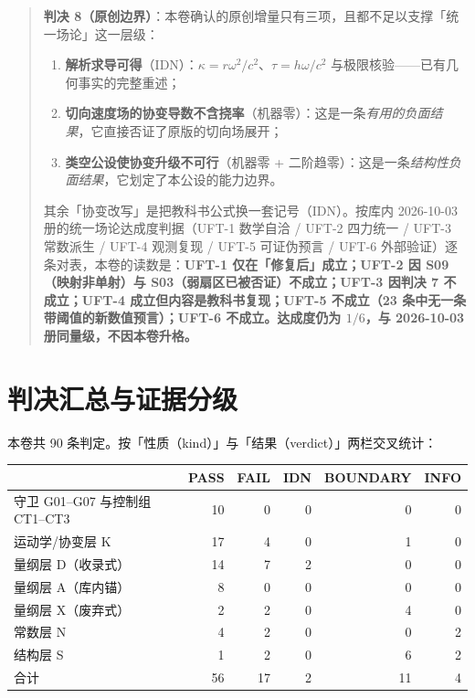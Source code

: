 \documentclass[UTF8,fontset=fandol,11pt]{ctexart}
\begin{document}
\begin{quote}
\textbf{判决 8（原创边界）}：本卷确认的原创增量只有三项，且都不足以支撑「统一场论」这一层级：
\begin{enumerate}
  \item \textbf{解析求导可得}（IDN）：$\kappa=r\omega^2/c^2$、$\tau=h\omega/c^2$ 与极限核验——已有几何事实的完整重述；
  \item \textbf{切向速度场的协变导数不含挠率}（机器零）：这是一条\emph{有用的负面结果}，它直接否证了原版的切向场展开；
  \item \textbf{类空公设使协变升级不可行}（机器零 + 二阶趋零）：这是一条\emph{结构性负面结果}，它划定了本公设的能力边界。
\end{enumerate}
其余「协变改写」是把教科书公式换一套记号（IDN）。按库内 2026-10-03 册的统一场论达成度判据（UFT-1 数学自洽 / UFT-2 四力统一 / UFT-3 常数派生 / UFT-4 观测复现 / UFT-5 可证伪预言 / UFT-6 外部验证）逐条对表，本卷的读数是：\textbf{UFT-1 仅在「修复后」成立；UFT-2 因 S09（映射非单射）与 S03（弱扇区已被否证）不成立；UFT-3 因判决 7 不成立；UFT-4 成立但内容是教科书复现；UFT-5 不成立（23 条中无一条带阈值的新数值预言）；UFT-6 不成立。达成度仍为 $1/6$，与 2026-10-03 册同量级，不因本卷升格。}
\end{quote}

\section{判决汇总与证据分级}
\label{sec:verdict}

本卷共 90 条判定。按「性质（kind）」与「结果（verdict）」两栏交叉统计：

\begin{center}
\begin{tabular}{lrrrrr}
\toprule
 & PASS & FAIL & IDN & BOUNDARY & INFO \\
\midrule
守卫 G01--G07 与控制组 CT1--CT3 & 10 & 0 & 0 & 0 & 0 \\
运动学/协变层 K & 17 & 4 & 0 & 1 & 0 \\
量纲层 D（收录式） & 14 & 7 & 2 & 0 & 0 \\
量纲层 A（库内锚） & 8 & 0 & 0 & 0 & 0 \\
量纲层 X（废弃式） & 2 & 2 & 0 & 4 & 0 \\
常数层 N & 4 & 2 & 0 & 0 & 2 \\
结构层 S & 1 & 2 & 0 & 6 & 2 \\
\midrule
合计 & 56 & 17 & 2 & 11 & 4 \\
\bottomrule
\end{tabular}
\end{center}
\end{document}
